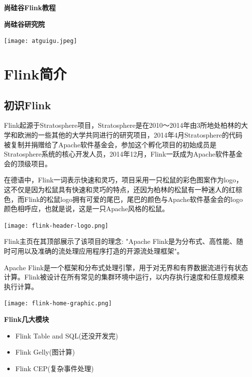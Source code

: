 \documentclass[oneside]{ctexbook}
\begin{document}
\begin{titlepage}
  \begin{center}
      \vspace*{1cm}

      \textbf{尚硅谷Flink教程}

      \vspace{1.5cm}

      \textbf{尚硅谷研究院}

      \vfill

      \vspace{0.8cm}

      \texttt{[image: atguigu.jpeg]}

  \end{center}
\end{titlepage}

\tableofcontents

\chapter{Flink简介}

\section{初识Flink}

Flink起源于Stratosphere项目，Stratosphere是在2010～2014年由3所地处柏林的大学和欧洲的一些其他的大学共同进行的研究项目，2014年4月Stratosphere的代码被复制并捐赠给了Apache软件基金会，参加这个孵化项目的初始成员是Stratosphere系统的核心开发人员，2014年12月，Flink一跃成为Apache软件基金会的顶级项目。

在德语中，Flink一词表示快速和灵巧，项目采用一只松鼠的彩色图案作为logo，这不仅是因为松鼠具有快速和灵巧的特点，还因为柏林的松鼠有一种迷人的红棕色，而Flink的松鼠logo拥有可爱的尾巴，尾巴的颜色与Apache软件基金会的logo颜色相呼应，也就是说，这是一只Apache风格的松鼠。

\noindent \texttt{[image: flink-header-logo.png]}

Flink主页在其顶部展示了该项目的理念: "Apache Flink是为分布式、高性能、随时可用以及准确的流处理应用程序打造的开源流处理框架"。

Apache Flink是一个框架和分布式处理引擎，用于对无界和有界数据流进行有状态计算。Flink被设计在所有常见的集群环境中运行，以内存执行速度和任意规模来执行计算。

\noindent \texttt{[image: flink-home-graphic.png]}

\textbf{Flink几大模块}

\begin{itemize}
\item Flink Table and SQL(还没开发完)
\item Flink Gelly(图计算)
\item Flink CEP(复杂事件处理)
\end{itemize}
\end{document}
